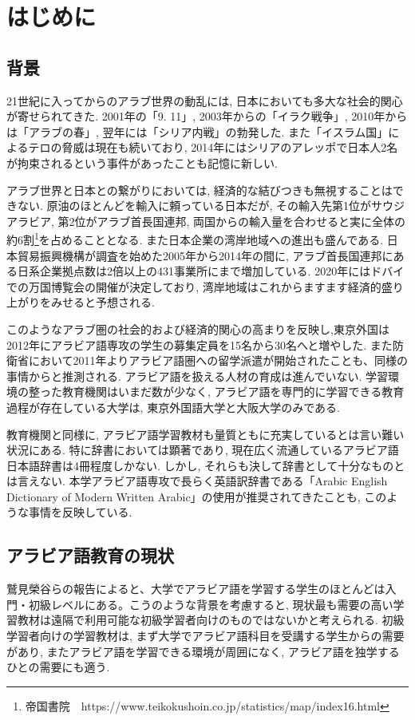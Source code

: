 \documentclass[technicalreport]{ieicej}
\begin{document}
\section{はじめに}
\subsection{背景}

21世紀に入ってからのアラブ世界の動乱には, 日本においても多大な社会的関心が寄せられてきた. 2001年の「9. 11」, 2003年からの「イラク戦争」, 2010年からは「アラブの春」, 翌年には「シリア内戦」の勃発した. また「イスラム国」によるテロの脅威は現在も続いており, 2014年にはシリアのアレッポで日本人2名が拘束されるという事件があったことも記憶に新しい. 
 
アラブ世界と日本との繋がりにおいては, 経済的な結びつきも無視することはできない. 原油のほとんどを輸入に頼っている日本だが, その輸入先第1位がサウジアラビア, 第2位がアラブ首長国連邦, 両国からの輸入量を合わせると実に全体の約6割\footnote{帝国書院　https://www.teikokushoin.co.jp/statistics/map/index16.html}を占めることとなる. また日本企業の湾岸地域への進出も盛んである. 日本貿易振興機構が調査を始めた2005年から2014年の間に, アラブ首長国連邦にある日系企業拠点数は2倍以上の431事業所にまで増加している. 2020年にはドバイでの万国博覧会の開催が決定しており, 湾岸地域はこれからますます経済的盛り上がりをみせると予想される. 

このようなアラブ圏の社会的および経済的関心の高まりを反映し,東京外国は2012年にアラビア語専攻の学生の募集定員を15名から30名へと増やした. また防衛省において2011年よりアラビア語圏への留学派遣が開始されたことも、同様の事情からと推測される. アラビア語を扱える人材の育成は進んでいない. 学習環境の整った教育機関はいまだ数が少なく, アラビア語を専門的に学習できる教育過程が存在している大学は, 東京外国語大学と大阪大学のみである. 

教育機関と同様に, アラビア語学習教材も量質ともに充実しているとは言い難い状況にある. 特に辞書においては顕著であり, 現在広く流通しているアラビア語日本語辞書は4冊程度しかない. しかし, それらも決して辞書として十分なものとは言えない. 本学アラビア語専攻で長らく英語訳辞書である「Arabic English Dictionary of Modern Written Arabic」の使用が推奨されてきたことも, このような事情を反映している.

\subsection{アラビア語教育の現状}
鷲見榮谷\cite{washimi2016}らの報告によると、大学でアラビア語を学習する学生のほとんどは入門・初級レベルにある。こうのような背景を考慮すると, 現状最も需要の高い学習教材は遠隔で利用可能な初級学習者向けのものではないかと考えられる. 初級学習者向けの学習教材は, まず大学でアラビア語科目を受講する学生からの需要があり, またアラビア語を学習できる環境が周囲になく, アラビア語を独学するひとの需要にも適う.
\end{document}
